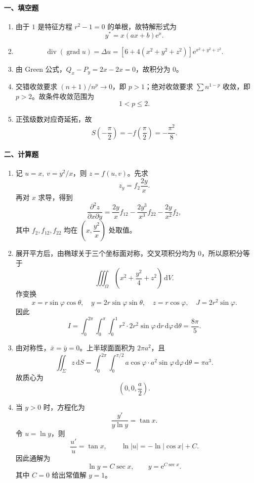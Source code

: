 \paragraph*{一、填空题}
\begin{enumerate}
  \item 由于 \(1\) 是特征方程 \(r^2-1=0\) 的单根，故特解形式为
  \[
    y^*=x(ax+b)\mathrm{e}^x.
  \]
  \item
  \[
    \operatorname{div}(\operatorname{grad}u)=\Delta u
    =\left[6+4(x^2+y^2+z^2)\right]\mathrm{e}^{x^2+y^2+z^2}.
  \]
  \item 由 Green 公式，\(Q_x-P_y=2x-2x=0\)，故积分为 \(0\)。
  \item 交错收敛要求 \((n+1)/n^p\to0\)，即 \(p>1\)；绝对收敛要求 \(\sum n^{1-p}\) 收敛，即 \(p>2\)。故条件收敛范围为
  \[
    1<p\le2.
  \]
  \item 正弦级数对应奇延拓，故
  \[
    S\left(-\frac{\pi}{2}\right)=-f\left(\frac{\pi}{2}\right)=-\frac{\pi^2}{8}.
  \]
\end{enumerate}

\paragraph*{二、计算题}
\begin{enumerate}
  \item 记 \(u=x,\ v=y^2/x\)，则 \(z=f(u,v)\)。先求
  \[
    z_y=f_2\frac{2y}{x}.
  \]
  再对 \(x\) 求导，得到
  \[
    \frac{\partial^2z}{\partial x\partial y}
    =\frac{2y}{x}f_{12}-\frac{2y^3}{x^3}f_{22}-\frac{2y}{x^2}f_2,
  \]
  其中 \(f_2,f_{12},f_{22}\) 均在 \(\left(x,\dfrac{y^2}{x}\right)\) 处取值。

  \item 展开平方后，由椭球关于三个坐标面对称，交叉项积分均为 \(0\)，所以原积分等于
  \[
    \iiint_\Omega\left(x^2+\frac{y^2}{4}+z^2\right)\,\mathrm{d}V.
  \]
  作变换
  \[
    x=r\sin\varphi\cos\theta,\quad
    y=2r\sin\varphi\sin\theta,\quad
    z=r\cos\varphi,\quad J=2r^2\sin\varphi.
  \]
  因此
  \[
    I=\int_0^{2\pi}\!\!\int_0^\pi\!\!\int_0^1 r^2\cdot2r^2\sin\varphi\,\mathrm{d}r\,\mathrm{d}\varphi\,\mathrm{d}\theta
    =\frac{8\pi}{5}.
  \]

  \item 由对称性，\(\bar x=\bar y=0\)。上半球面面积为 \(2\pi a^2\)，且
  \[
    \iint_\Sigma z\,\mathrm{d}S
    =\int_0^{2\pi}\!\!\int_0^{\pi/2}a\cos\varphi\cdot a^2\sin\varphi\,\mathrm{d}\varphi\,\mathrm{d}\theta
    =\pi a^3.
  \]
  故质心为
  \[
    \left(0,0,\frac a2\right).
  \]

  \item 当 \(y>0\) 时，方程化为
  \[
    \frac{y'}{y\ln y}=\tan x.
  \]
  令 \(u=\ln y\)，则
  \[
    \frac{u'}u=\tan x,\qquad \ln|u|=-\ln|\cos x|+C.
  \]
  因此通解为
  \[
    \ln y=C\sec x,\qquad y=\mathrm{e}^{C\sec x}.
  \]
  其中 \(C=0\) 给出常值解 \(y=1\)。
\end{enumerate}

